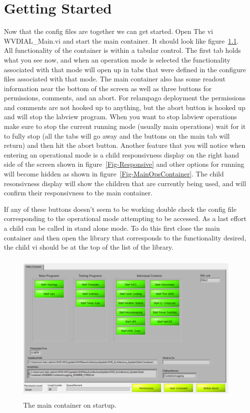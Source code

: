
\chapter{Getting Started}
\label{CH-GettingStarted}

Now that the config files are together we can get started. Open The vi WVDIAL\_Main.vi and start the main container. It should look like figure~\ref{Fig-StartupContainer}. All functionality of the container is within a tabular control. The first tab holds what you see now, and when an operation mode is selected the functionality associated with that mode will open up in tabs that were defined in the configure files associated with that mode. The main container also has some readout information near the bottom of the screen as well as three buttons for permissions, comments, and an abort. For relampago deployment the permissions and comments are not hooked up to anything, but the abort button is hooked up and will stop the labview program. When you want to stop labview operations make sure to stop the current running mode (usually main operations) wait for it to fully stop (all the tabs will go away and the buttons on the main tab will return) and then hit the abort button. Another feature that you will notice when entering an operational mode is a child responsivness display on the right hand side of the screen shown in figure~\ref{Fig-Responsive} and other options for running will become hidden as shown in figure~\ref{Fig-MainOpsContainer}. The child resonsivness display will show the children that are currently being used, and will confirm their responsivness to the main container. 

If any of these buttons doesn't seem to be working double check the config file corresponding to the operational mode attempting to be accessed. As a last effort a child can be called in stand alone mode. To do this first close the main container and then open the library that corresponds to the functionality desired, the child vi should be at the top of the list of the library. 

\begin{figure}[!ht]\centering
\includegraphics[height=3in]{Figures/StartupContainer}
\caption{The main container on startup.}
\label{Fig-StartupContainer}
\end{figure}


